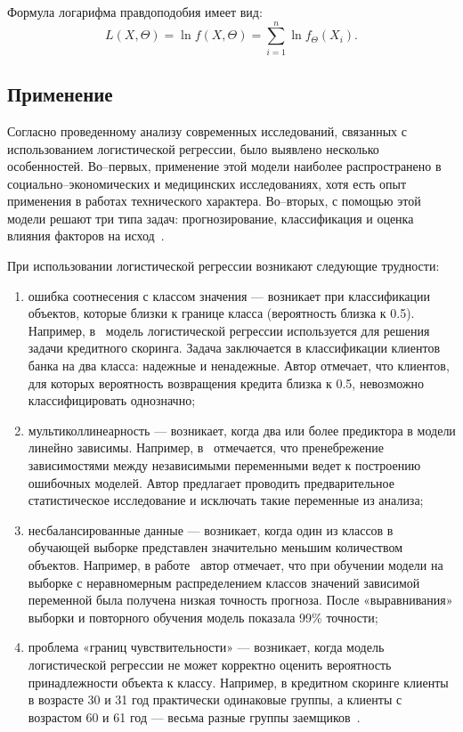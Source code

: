 Формула логарифма правдоподобия имеет вид:
\begin{equation}
    L(X, \Theta) = \ln f(X, \Theta) = \sum_{i=1}^{n} \ln f_{\Theta}(X_i).
\end{equation}

\subsection*{Применение}

Согласно проведенному анализу современных исследований, связанных с использованием логистической регрессии, было выявлено несколько особенностей.
Во--первых, применение этой модели наиболее распространено в социально--экономических и медицинских исследованиях, хотя есть опыт применения в работах технического характера.
Во--вторых, с помощью этой модели решают три типа задач: прогнозирование, классификация и оценка влияния факторов на исход~\cite{vlasenko}.

При использовании логистической регрессии возникают следующие трудности:
\begin{enumerate}[label=\arabic*), leftmargin=1.6\parindent]
    \item ошибка соотнесения с классом значения --- возникает при классификации объектов, которые близки к границе класса (вероятность близка к 0.5).
    Например, в~\cite{simov} модель логистической регрессии используется для решения задачи кредитного скоринга.
    Задача заключается в классификации клиентов банка на два класса: надежные и ненадежные.
    Автор отмечает, что клиентов, для которых вероятность возвращения кредита близка к 0.5, невозможно классифицировать однозначно;
    \item мультиколлинеарность --- возникает, когда два или более предиктора в модели линейно зависимы.
    Например, в~\cite{muradov} отмечается, что пренебрежение зависимостями между независимыми переменными ведет к построению ошибочных моделей.
    Автор предлагает проводить предварительное статистическое исследование и исключать такие переменные из анализа;
    \item несбалансированные данные --- возникает, когда один из классов в обучающей выборке представлен значительно меньшим количеством объектов.
    Например, в работе~\cite{seredniy} автор отмечает, что при обучении модели на выборке с неравномерным распределением классов значений зависимой переменной была получена низкая точность прогноза.
    После «выравнивания» выборки и повторного обучения модель показала 99\% точности;
    \item проблема «границ чувствительности» --- возникает, когда модель логистической регрессии не может корректно оценить вероятность принадлежности объекта к классу.
    Например, в кредитном скоринге клиенты в возрасте 30 и 31 год практически одинаковые группы, а клиенты с возрастом 60 и 61 год --- весьма разные группы заемщиков~\cite{saponov}.
\end{enumerate}

